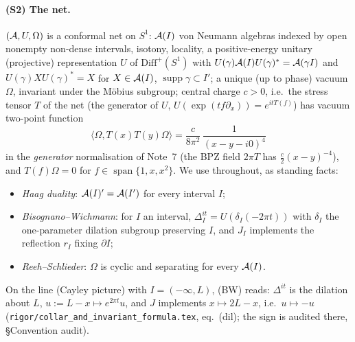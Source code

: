 \documentclass[11pt]{article}
\newcommand{\Om}{\Omega}
\newcommand{\ip}[2]{\langle#1,#2\rangle}
\newcommand{\supp}{\operatorname{supp}}
\begin{document}
\paragraph{(S2) The net.}
$(\cA,U,\Om)$ is a conformal net on $S^1$: $\mathcal A(I)$ von Neumann algebras indexed by open nonempty non-dense
intervals, isotony, locality, a positive-energy unitary (projective) representation $U$ of
$\mathrm{Diff}^+(S^1)$ with $U(\gamma)\mathcal A(I)U(\gamma)^*=\mathcal A(\gamma I)$ and
$U(\gamma)XU(\gamma)^*=X$ for $X\in\mathcal A(I)$, $\supp\gamma\subset I'$; a unique (up to phase) vacuum $\Om$,
invariant under the M\"obius subgroup; central charge $c>0$, i.e.\ the stress tensor $T$ of the net
(the generator of $U$, $U(\exp(tf\partial_x))=e^{itT(f)}$) has vacuum two-point function
\begin{equation}\label{eq:TT}
 \ip{\Om}{T(x)T(y)\Om}=\frac{c}{8\pi^2}\,\frac1{(x-y-i0)^4}
\end{equation}
in the \emph{generator} normalisation of Note~7 (the BPZ field $2\pi T$ has $\frac c2(x-y)^{-4}$),
and $T(f)\Om=0$ for $f\in\operatorname{span}\{1,x,x^2\}$.  We use throughout, as standing facts:
\begin{itemize}[leftmargin=2em]
\item[(HD)] \emph{Haag duality}: $\mathcal A(I)'=\mathcal A(I')$ for every interval $I$;
\item[(BW)] \emph{Bisognano--Wichmann}: for $I$ an interval, $\Delta_I^{it}=U(\delta_I(-2\pi t))$ with
 $\delta_I$ the one-parameter dilation subgroup preserving $I$, and $J_I$ implements the reflection $r_I$
 fixing $\partial I$;
\item[(RS)] \emph{Reeh--Schlieder}: $\Om$ is cyclic and separating for every $\mathcal A(I)$.
\end{itemize}
On the line (Cayley picture) with $I=(-\infty,L)$, (BW) reads: $\Delta^{it}$ is the dilation about $L$,
$u:=L-x\mapsto e^{2\pi t}u$, and $J$ implements $x\mapsto 2L-x$, i.e.\ $u\mapsto-u$
(\texttt{rigor/collar\_and\_invariant\_formula.tex}, eq.~(dil); the sign is audited there, \S{}Convention audit).
\end{document}

